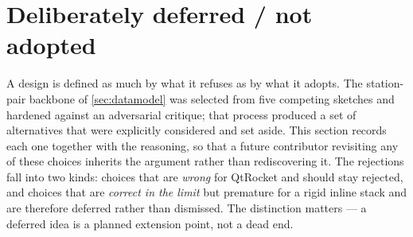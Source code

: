 \section{Deliberately deferred / not adopted}\label{sec:deferred}

A design is defined as much by what it refuses as by what it adopts. The station-pair
backbone of \cref{sec:datamodel} was selected from five competing sketches and hardened
against an adversarial critique; that process produced a set of alternatives that were
explicitly considered and set aside. This section records each one together with the
reasoning, so that a future contributor revisiting any of these choices inherits the
argument rather than rediscovering it. The rejections fall into two kinds: choices that
are \emph{wrong} for QtRocket and should stay rejected, and choices that are \emph{correct
in the limit} but premature for a rigid inline stack and are therefore deferred rather than
dismissed. The distinction matters --- a deferred idea is a planned extension point, not a
dead end.

